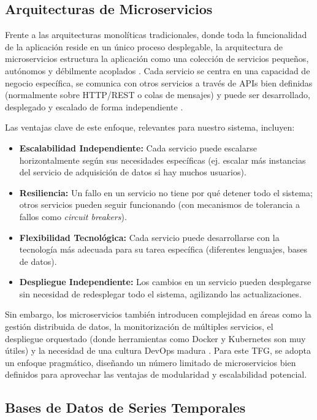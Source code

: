 \subsection{Arquitecturas de Microservicios}
\label{subsec:ea_microservicios}

Frente a las arquitecturas monolíticas tradicionales, donde toda la funcionalidad de la aplicación reside en un único proceso desplegable, la arquitectura de microservicios estructura la aplicación como una colección de servicios pequeños, autónomos y débilmente acoplados \cite{fowler_microservices}. Cada servicio se centra en una capacidad de negocio específica, se comunica con otros servicios a través de APIs bien definidas (normalmente sobre HTTP/REST o colas de mensajes) y puede ser desarrollado, desplegado y escalado de forma independiente \cite{newman_building_microservices}.

Las ventajas clave de este enfoque, relevantes para nuestro sistema, incluyen:
\begin{itemize}
    \item \textbf{Escalabilidad Independiente:} Cada servicio puede escalarse horizontalmente según sus necesidades específicas (ej. escalar más instancias del servicio de adquisición de datos si hay muchos usuarios).
    \item \textbf{Resiliencia:} Un fallo en un servicio no tiene por qué detener todo el sistema; otros servicios pueden seguir funcionando (con mecanismos de tolerancia a fallos como \textit{circuit breakers}).
    \item \textbf{Flexibilidad Tecnológica:} Cada servicio puede desarrollarse con la tecnología más adecuada para su tarea específica (diferentes lenguajes, bases de datos).
    \item \textbf{Despliegue Independiente:} Los cambios en un servicio pueden desplegarse sin necesidad de redesplegar todo el sistema, agilizando las actualizaciones.
\end{itemize}
Sin embargo, los microservicios también introducen complejidad en áreas como la gestión distribuida de datos, la monitorización de múltiples servicios, el despliegue orquestado (donde herramientas como Docker y Kubernetes son muy útiles) y la necesidad de una cultura DevOps madura \cite{newman_building_microservices}. Para este TFG, se adopta un enfoque pragmático, diseñando un número limitado de microservicios bien definidos para aprovechar las ventajas de modularidad y escalabilidad potencial.

\subsection{Bases de Datos de Series Temporales}
\label{subsec:ea_db_timeseries}

